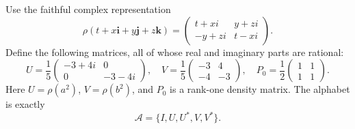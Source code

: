 Use the faithful complex representation
\[
 \rho(t+x\mathbf i+y\mathbf j+z\mathbf k)=
 \begin{pmatrix}t+xi&y+zi\\-y+zi&t-xi\end{pmatrix}.
\]
Define the following matrices, all of whose real and imaginary parts are
rational:
\begin{equation}\label{eq:rationaldata58}
 U=\frac15\begin{pmatrix}-3+4i&0\\0&-3-4i\end{pmatrix},\quad
 V=\frac15\begin{pmatrix}-3&4\\-4&-3\end{pmatrix},\quad
 P_0=\frac12\begin{pmatrix}1&1\\1&1\end{pmatrix}.
\end{equation}
Here $U=\rho(a^2)$, $V=\rho(b^2)$, and $P_0$ is a rank-one density
matrix. The alphabet is exactly
\begin{equation}\label{eq:rationalalphabet58}
                  \mathcal A=\{I,U,U^*,V,V^*\}.
\end{equation}


